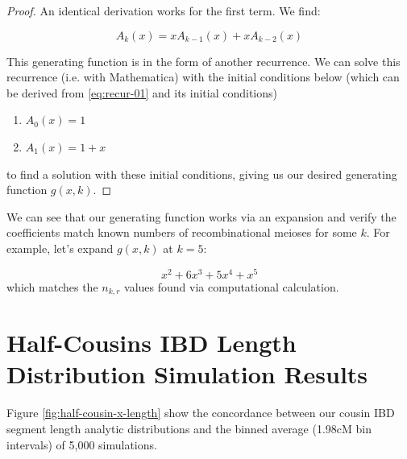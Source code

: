 \documentclass[9pt,twocolumn,twoside]{gsajnl}
\begin{document}
\begin{proof}
 An identical derivation works for the first term. We find:

 \begin{equation} \label{eq:rec-gen}
   A_k(x) = xA_{k-1}(x) + xA_{k-2}(x)
 \end{equation}

This generating function is in the form of another recurrence. We can solve
this recurrence (i.e. with Mathematica) with the initial conditions below
(which can be derived from \eqref{eq:recur-01} and its initial conditions)
%
\begin{enumerate}
  \item $ A_0(x) = 1 $
  \item $ A_1(x) = 1 + x $
\end{enumerate}
%
to find a solution with these initial conditions, giving us our desired
generating function $g(x,k)$.

\end{proof}

We can see that our generating function works via an expansion and verify
the coefficients match known numbers of recombinational meioses for some $k$.
For example, let's expand $g(x, k)$ at $k=5$:

\begin{equation*}
  x^2 + 6x^3 + 5x^4 + x^5
\end{equation*}
%
which matches the $n_{k,r}$ values found via computational calculation.

\section*{Half-Cousins IBD Length Distribution Simulation Results}

Figure \ref{fig:half-cousin-x-length} show the concordance between our cousin
IBD segment length analytic distributions and the binned average (1.98cM bin
intervals) of 5,000 simulations.
\end{document}
